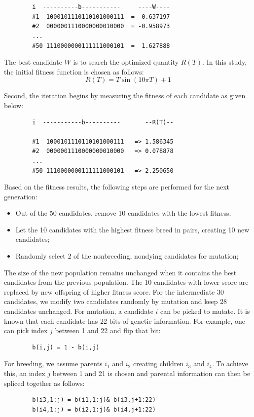 \documentclass[10pt,journal,compsoc]{IEEEtran}
\begin{document}
		\begin{verbatim}
		
		
		i  ----------b-----------     ----W----
		#1  1000101110110101000111  =  0.637197
		#2  0000001110000000010000  = -0.958973
		...
		#50 1110000000111111000101  =  1.627888
		\end{verbatim}
The best candidate $W$ is to search the optimized quantity $R(T)$.
				\vskip 0.1in
		In this study, the initial fitness function is chosen as follows:
\begin{equation}	
				R(T) = T \sin ( 10 \pi T ) + 1
\end{equation}
		
		Second, the iteration begins by measuring the fitness of each candidate as given below:
		\begin{verbatim}
		i  -----------b----------       --R(T)--
		
		#1  1000101110110101000111   => 1.586345
		#2  0000001110000000010000   => 0.078878
		...
		#50 1110000000111111000101   => 2.250650
		\end{verbatim}	

		Based on the fitness results, the following steps are performed for the next
		generation:
		\begin{itemize}
			\item {Out of the 50 candidates, remove 10 candidates with the lowest fitness; }
			\item {Let the 10 candidates with the highest fitness breed in pairs, creating 10 new candidates;}
			\item {Randomly select 2 of the nonbreeding, nondying candidates for mutation;}
		\end{itemize}
		\vskip 0.1in
		The size of the new population remains unchanged when it contains the best candidates from the previous population. The 10 candidates with lower score are replaced by new offspring of higher fitness score. For the intermediate 30 candidates, we modify two candidates randomly by mutation and keep 28 candidates unchanged.
		\vskip 0.1in
		For mutation, a candidate $i$ can be picked to mutate. It is known that each candidate
		has 22 bits of genetic information. For example, one can pick index $j$ between 1 and 22 and
		flip that bit:

		\begin{verbatim}
		b(i,j) = 1 - b(i,j)
		\end{verbatim}
		\vskip 0.1in
		For breeding, we assume parents $i_1$ and $i_2$ creating children $i_3$ and $i_4$.
		To achieve this, an index $j$ between 1 and 21 is chosen and parental information can then be spliced together as follows:
		\begin{verbatim}
		b(i3,1:j) = b(i1,1:j)& b(i3,j+1:22)
		b(i4,1:j) = b(i2,1:j)& b(i4,j+1:22)
		\end{verbatim}
\end{document}
